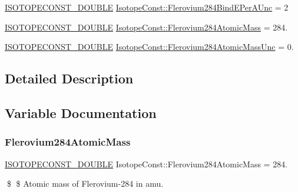 \begin{DoxyCompactItemize}
\mbox{\hyperlink{group___isotope_const-_macros_ga8f45a7272ce02c0b4c65c44636ed719a}{I\+S\+O\+T\+O\+P\+E\+C\+O\+N\+S\+T\+\_\+\+D\+O\+U\+B\+LE}} \mbox{\hyperlink{group___isotope_const-_flerovium-_fl284_gade62ea43cef5a14653053a28bb0e0571}{Isotope\+Const\+::\+Flerovium284\+Bind\+E\+Per\+A\+Unc}} = 2
\item 
\mbox{\hyperlink{group___isotope_const-_macros_ga8f45a7272ce02c0b4c65c44636ed719a}{I\+S\+O\+T\+O\+P\+E\+C\+O\+N\+S\+T\+\_\+\+D\+O\+U\+B\+LE}} \mbox{\hyperlink{group___isotope_const-_flerovium-_fl284_ga65f7925b73fca96ef815679693c32a78}{Isotope\+Const\+::\+Flerovium284\+Atomic\+Mass}} = 284.
\item 
\mbox{\hyperlink{group___isotope_const-_macros_ga8f45a7272ce02c0b4c65c44636ed719a}{I\+S\+O\+T\+O\+P\+E\+C\+O\+N\+S\+T\+\_\+\+D\+O\+U\+B\+LE}} \mbox{\hyperlink{group___isotope_const-_flerovium-_fl284_ga1e18abc063c1a0148e9899bc0065d6b4}{Isotope\+Const\+::\+Flerovium284\+Atomic\+Mass\+Unc}} = 0.
\end{DoxyCompactItemize}


\subsection{Detailed Description}


\subsection{Variable Documentation}
\mbox{\label{group___isotope_const-_flerovium-_fl284_ga65f7925b73fca96ef815679693c32a78}} 
\subsubsection{\texorpdfstring{Flerovium284\+Atomic\+Mass}{Flerovium284AtomicMass}}
{\footnotesize\ttfamily \mbox{\hyperlink{group___isotope_const-_macros_ga8f45a7272ce02c0b4c65c44636ed719a}{I\+S\+O\+T\+O\+P\+E\+C\+O\+N\+S\+T\+\_\+\+D\+O\+U\+B\+LE}} Isotope\+Const\+::\+Flerovium284\+Atomic\+Mass = 284.}

\$ \$ Atomic mass of Flerovium-\/284 in amu. \mbox{\label{group___isotope_const-_flerovium-_fl284_ga1e18abc063c1a0148e9899bc0065d6b4}} 
